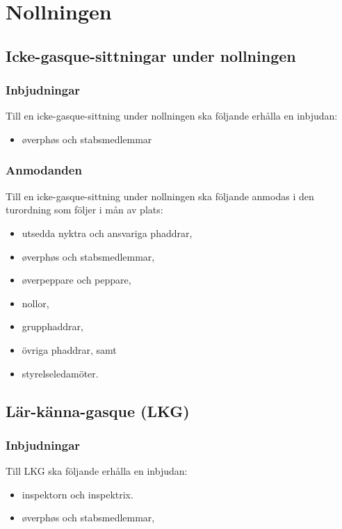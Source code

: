 \documentclass{dsekprotokoll}
\begin{document}
\section{Nollningen}

\subsection{Icke-gasque-sittningar under nollningen} \label{icke-gasque}
\subsubsection{Inbjudningar}
Till en icke-gasque-sittning under nollningen ska följande erhålla en inbjudan:
\begin{itemize}
    \item øverphøs och stabsmedlemmar
\end{itemize}

\subsubsection{Anmodanden}
Till en icke-gasque-sittning under nollningen ska följande
anmodas i den turordning som följer i mån av plats:

\begin{itemize}
    \item utsedda nyktra och ansvariga phaddrar,
    \item øverphøs och stabsmedlemmar,
    \item øverpeppare och peppare,
    \item nollor,
    \item grupphaddrar,
    \item övriga phaddrar, samt
    \item styrelseledamöter.
\end{itemize}

\subsection{Lär-känna-gasque (LKG)}

\subsubsection{Inbjudningar}
Till LKG ska följande erhålla en inbjudan:
\begin{itemize}
    \item inspektorn och inspektrix.
    \item øverphøs och stabsmedlemmar,
\end{itemize}
\end{document}
